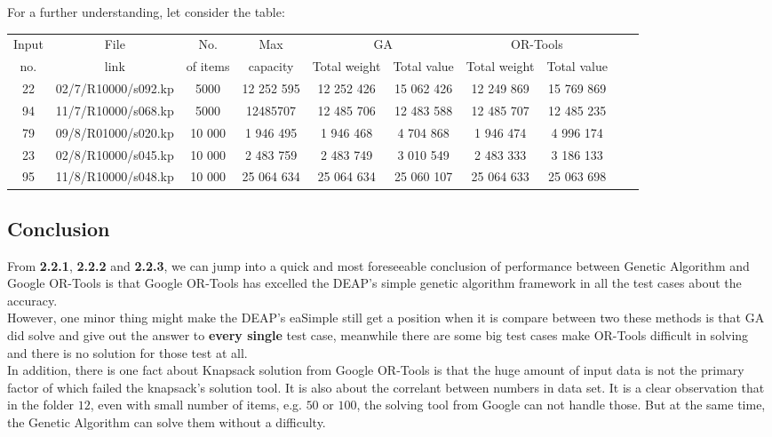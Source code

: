 \documentclass{article}
\begin{document}
For a further understanding, let consider the table:
    \begin{center}
        \begin{tabular}{|c|c| c|c| c|c| c|c| c|c|}
        \hline
            Input& File& No. & Max& \multicolumn{2}{c|}{GA} & \multicolumn{2}{c|}{OR-Tools}\\
            no.&link& of items &capacity& Total weight & Total value & Total weight & Total value\\
        \hline
            22 & 02/7/R10000/s092.kp & 5000 & 12 252 595 & 12 252 426 & 15 062 426 & 12 249 869 & 15 769 869\\
            94 & 11/7/R10000/s068.kp & 5000 & 12485707 & 12 485 706 & 12 483 588 & 12 485 707 & 12 485 235\\
            79 & 09/8/R01000/s020.kp & 10 000 & 1 946 495 & 1 946 468 & 4 704 868 & 1 946 474 & 4 996 174\\
            23 & 02/8/R10000/s045.kp & 10 000 & 2 483 759 & 2 483 749 & 3 010 549 & 2 483 333 & 3 186 133\\
            95 & 11/8/R10000/s048.kp & 10 000 & 25 064 634 & 25 064 634 & 25 060 107 & 25 064 633 & 25 063 698\\
        \hline
        \hline 
        \end{tabular}
    \end{center}
\subsection{Conclusion}
From \textbf{2.2.1}, \textbf{2.2.2} and \textbf{2.2.3}, we can jump into a quick and most foreseeable conclusion of performance between Genetic Algorithm and Google OR-Tools is that Google OR-Tools has excelled the DEAP's simple genetic algorithm framework in all the test cases about the accuracy.\\

However, one minor thing might make the DEAP's eaSimple still get a position when it is compare between two these methods is that GA did solve and give out the answer to \textbf{every single} test case, meanwhile there are some big test cases make OR-Tools difficult in solving and there is no solution for those test at all.\\

In addition, there is one fact about Knapsack solution from Google OR-Tools is that the huge amount of input data is not the primary factor of which failed the knapsack's solution tool. It is also about the correlant between numbers in data set. It is a clear observation that in the folder $12$, even with small number of items, e.g. $50$ or $100$, the solving tool from Google can not handle those. But at the same time, the Genetic Algorithm can solve them without a difficulty.\\
\end{document}
